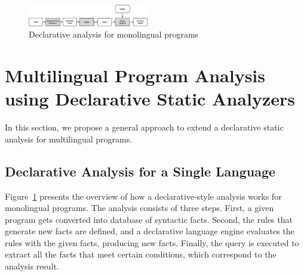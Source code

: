 \begin{figure}[t]
  \centering
  \vspace{2mm}
  \includegraphics[width=0.47\textwidth]{img/ov1.png}
  \caption{Declarative analysis for monolingual programs}
  \label{fig:ov1}
\end{figure}

\section{Multilingual Program Analysis using Declarative Static Analyzers}
\label{sec:approach}

In this section, we propose a general approach to extend a declarative
static analysis for multilingual programs.

\subsection{Declarative Analysis for a Single Language}

%
Figure~\ref{fig:ov1} presents the overview of how a
declarative-style analysis works for monolingual programs.
The analysis consists of three steps.
First, a given program gets converted into database of syntactic facts.
Second, the rules that generate new facts are defined, and
a declarative language engine evaluates the rules with the given facts,
producing new facts.
Finally, the query is executed to extract all the facts that meet
certain conditions, which correspond to the analysis result.

